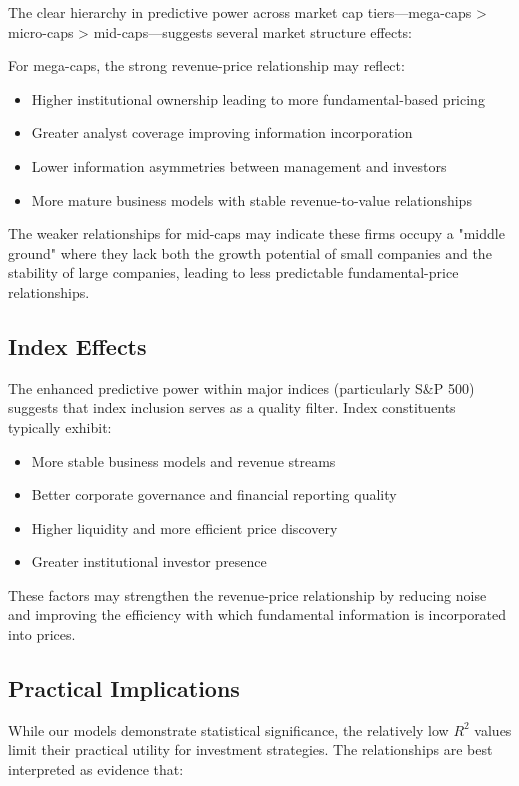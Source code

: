 \documentclass[11pt]{article}
\begin{document}
The clear hierarchy in predictive power across market cap tiers—mega-caps > micro-caps > mid-caps—suggests several market structure effects:

For mega-caps, the strong revenue-price relationship may reflect:
\begin{itemize}
\item Higher institutional ownership leading to more fundamental-based pricing
\item Greater analyst coverage improving information incorporation
\item Lower information asymmetries between management and investors
\item More mature business models with stable revenue-to-value relationships
\end{itemize}

The weaker relationships for mid-caps may indicate these firms occupy a "middle ground" where they lack both the growth potential of small companies and the stability of large companies, leading to less predictable fundamental-price relationships.

\subsection{Index Effects}

The enhanced predictive power within major indices (particularly S\&P 500) suggests that index inclusion serves as a quality filter. Index constituents typically exhibit:
\begin{itemize}
\item More stable business models and revenue streams
\item Better corporate governance and financial reporting quality  
\item Higher liquidity and more efficient price discovery
\item Greater institutional investor presence
\end{itemize}

These factors may strengthen the revenue-price relationship by reducing noise and improving the efficiency with which fundamental information is incorporated into prices.

\subsection{Practical Implications}

While our models demonstrate statistical significance, the relatively low $R^2$ values limit their practical utility for investment strategies. The relationships are best interpreted as evidence that:
\end{document}
